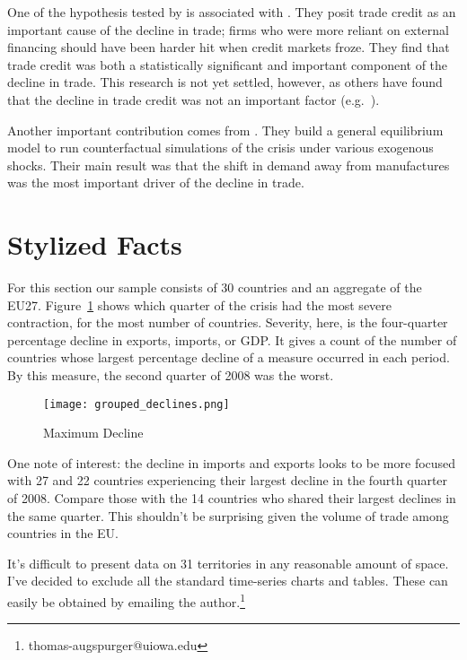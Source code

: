\documentclass[11pt]{article}
\begin{document}
  One of the hypothesis tested by \cite{llt:2010} is associated with \cite{chor-manova:2012}. They posit trade credit as an important cause of the decline in trade; firms who were more reliant on external financing should have been harder hit when credit markets froze.  They find that trade credit was both a statistically significant and important component of the decline in trade.  This research is not yet settled, however, as others have found that the decline in trade credit was not an important factor (e.g.\ \cite{RePEc:imf:imfwpa:11/16}).

  Another important contribution comes from \cite{eaton-kortum-neiman-romalis:2011}.  They build a general equilibrium model to run counterfactual simulations of the crisis under various exogenous shocks.  Their main result was that the shift in demand away from manufactures was the most important driver of the decline in trade.

\section{Stylized Facts}
\label{sec:stylized_facts}

  For this section our sample consists of 30 countries and an aggregate of the EU27.  Figure~\ref{fig:declines} shows which quarter of the crisis had the most severe contraction, for the most number of countries.  Severity, here, is the four-quarter percentage decline in exports, imports, or GDP.  It gives a count of the number of countries whose largest percentage decline of a measure occurred in each period.  By this measure, the second quarter of 2008 was the worst.

  \begin{figure}[ht]
    \centering
      \texttt{[image: grouped\_declines.png]}
    \caption{Maximum Decline}
    \label{fig:declines}
  \end{figure}

  One note of interest: the decline in imports and exports looks to be more focused with 27 and 22 countries experiencing their largest decline in the fourth quarter of 2008.  Compare those with the 14 countries who shared their largest declines in the same quarter.  This shouldn't be surprising given the volume of trade among countries in the EU.

  It's difficult to present data on 31 territories in any reasonable amount of space.  I've decided to exclude all the standard time-series charts and tables.  These can easily be obtained by emailing the author.\footnote{thomas-augspurger@uiowa.edu}
\end{document}
